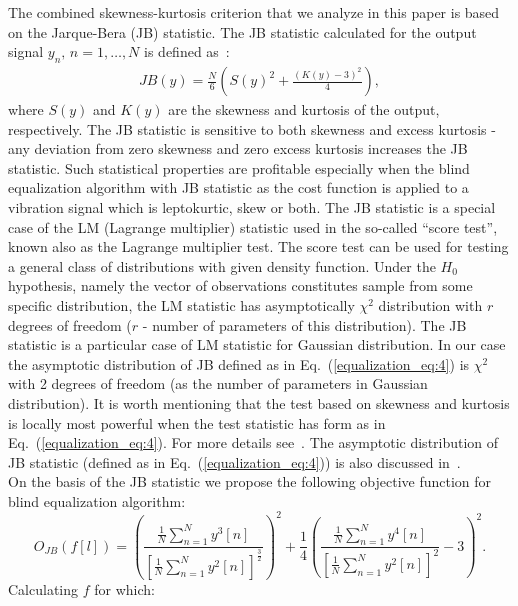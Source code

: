 The combined skewness-kurtosis criterion that we analyze in this paper is based on the Jarque-Bera (JB) statistic. The JB statistic calculated for the output signal $y_n,\,n=1,\ldots,N$ is defined as~\cite{Jarque1980255}:
\begin{eqnarray}\label{equalization_eq:4}
JB(y)=\frac{N}{6}\left(S(y)^2+\frac{\left(K(y)-3\right)^2}{4}\right),
\end{eqnarray}
where $S(y)$ and $K(y)$ are the skewness and kurtosis of the output, respectively. The JB statistic is sensitive to both skewness and excess kurtosis - any deviation from zero skewness and zero excess kurtosis increases the JB statistic. Such statistical properties are profitable especially when the blind equalization algorithm with JB statistic as the cost function is applied to a vibration signal which is leptokurtic, skew or both. The JB statistic is a special case of the LM (Lagrange multiplier) statistic used in the so-called “score test”, known also as the Lagrange multiplier test. The score test can be used for testing a general class of distributions with given density function. Under the $H_0$ hypothesis, namely the vector of observations constitutes sample from some specific distribution, the LM statistic has asymptotically $\chi ^2$ distribution with $r$ degrees of freedom ($r$ - number of parameters of this distribution). The JB statistic is a particular case of LM statistic for Gaussian distribution. In our case the asymptotic distribution of JB defined as in Eq.~(\ref{equalization_eq:4}) is $\chi ^2$ with 2 degrees of freedom (as the number of parameters in Gaussian distribution).  It is worth mentioning that the test based on skewness and kurtosis is locally most powerful when the test statistic has form as in Eq.~(\ref{equalization_eq:4}). For more details see~\cite{Jarque1987163}. The asymptotic distribution of JB statistic (defined as in Eq.~(\ref{equalization_eq:4})) is also discussed in~\cite{Bai200549}.\\
On the basis of the JB statistic we propose the following objective function for blind equalization algorithm:
\begin{equation}
O_{JB}\left(f\left[l\right]\right)=\left(\frac{\frac{1}{N}\sum\limits_{n=1}^{N} y^3[n]}{\left[\frac{1}{N}\sum\limits_{n=1}^{N} y^2[n]\right]^{\frac{3}{2}}}\right)^2 + \frac{1}{4}\left(\frac{\frac{1}{N}\sum\limits_{n=1}^{N} y^4[n]}{\left[\frac{1}{N}\sum\limits_{n=1}^{N} y^2[n]\right]^2}-3\right)^2.
\label{equalization_JBcriterion}
\end{equation}
Calculating $f$ for which:

